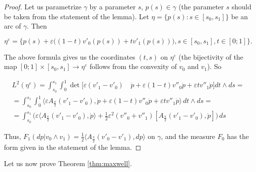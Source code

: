 \documentclass[14pt]{extarticle}
\theoremstyle{remark}
\theoremstyle{definition}
\begin{document}
\begin{proof}
	Let us parametrize $\gamma$ by a parameter $s$, $p(s)\in\gamma$ (the parameter $s$ should be taken from the statement of the lemma). Let $\eta=\{p(s):s\in[s_0,s_1]\}$ be an arc of $\gamma$. Then
	
	\[
		\eta^\varepsilon = \Big\{
			p(s)+\varepsilon\big((1-t)v'_0(p(s)) + tv'_1(p(s))\big),
			s\in[s_0,s_1], t\in[0;1]
		\Big\}.
	\]

	The above formula gives us the coordinates $(t,s)$ on $\eta^\varepsilon$ (the bijectivity of the map $[0;1] \times [s_0,s_1]\to\eta^\varepsilon$ follows from the convexity of $v_0$ and $v_1$). So
	
	\begin{multline*}
		L^2(\eta^\varepsilon) = 
		\int_{s_0}^{s_1}\int_0^1 \det
		\Big[\varepsilon(v'_1-v'_0)\quad\dot p + \varepsilon (1-t)v''_0\dot p + \varepsilon tv''_1\dot p
		\Big]dt\wedge ds =\\
		=\int_{s_0}^{s_1}\int_0^1
		\big\langle 
			\varepsilon A_{\frac\pi2}(v'_1-v'_0),
			\dot p + \varepsilon (1-t)v''_0\dot p + \varepsilon tv''_1\dot p
		\big\rangle\,dt\wedge ds = \\
		=\int_{s_0}^{s_1} \Big(
			\varepsilon\langle A_{\frac\pi2}(v'_1-v'_0),\dot p\rangle +
			\frac12\varepsilon^2(v''_0+v''_1)[A_{\frac\pi2}(v'_1-v'_0),\dot p]
		\Big)\,ds
	\end{multline*}

	\noindent Thus, $F_1(dp|v_0\wedge v_1) = \frac12\langle A_{\frac\pi2}(v'_0-v'_1),d p\rangle$ on $\gamma$, and the measure $F_0$ has the form given in the statement of the lemma.
\end{proof}

Let us now prove Theorem \ref{thm:maxwell}.
\end{document}
